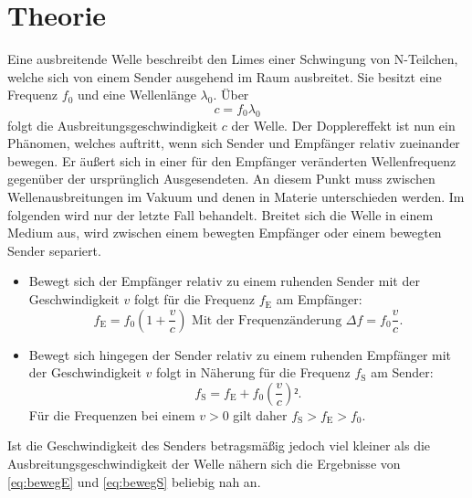 
\section{Theorie}
\label{sec:Theorie}
Eine ausbreitende Welle beschreibt den Limes einer Schwingung von N-Teilchen,
 welche sich von einem Sender ausgehend im Raum ausbreitet. Sie besitzt eine Frequenz $f_0$ und eine Wellenlänge $\lambda_0$. Über
 \begin{equation}
   c = f_0 \lambda_0 \label{eq:c}
   \end{equation}
   folgt die Ausbreitungsgeschwindigkeit $c$ der Welle.
Der Dopplereffekt ist nun ein Phänomen, welches auftritt,
 wenn sich Sender und Empfänger relativ zueinander bewegen. Er äußert sich in
  einer für den Empfänger veränderten Wellenfrequenz gegenüber der ursprünglich
   Ausgesendeten. An diesem Punkt muss zwischen Wellenausbreitungen im Vakuum
    und denen in Materie unterschieden werden. Im folgenden wird nur der letzte
     Fall behandelt. Breitet sich die Welle in einem
     Medium aus, wird zwischen einem bewegten Empfänger oder einem bewegten
      Sender separiert.
\begin{itemize}
\item Bewegt sich der Empfänger relativ zu einem ruhenden Sender mit der
 Geschwindigkeit $v$ folgt für die Frequenz $f_\text{E}$ am Empfänger:
 \begin{equation}
   f_\text{E} = f_0\left(1+\frac{v}{c}\right) \text{ Mit der Frequenzänderung }\Delta f = f_0\frac{v}{c}\text{.}\label{eq:bewegE}
   \end{equation}
   \item Bewegt sich hingegen der Sender relativ zu einem ruhenden Empfänger mit der
    Geschwindigkeit $v$ folgt in Näherung für die Frequenz $f_\text{S}$ am Sender:
    \begin{equation}
      f_\text{S} = f_\text{E} + f_0\left(\frac{v}{c}\right)²\text{.}\label{eq:bewegS}
      \end{equation}
      Für die Frequenzen bei einem $v > 0$ gilt daher $f_\text{S} > f_\text{E} > f_0$.
\end{itemize}
Ist die Geschwindigkeit des Senders betragsmäßig jedoch viel kleiner als
 die Ausbreitungsgeschwindigkeit der Welle nähern sich die Ergebnisse von
  \eqref{eq:bewegE} und \eqref{eq:bewegS} beliebig nah an.
